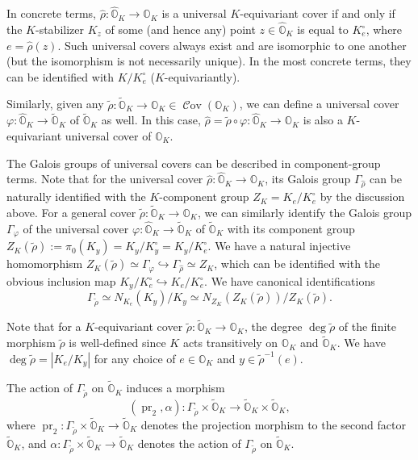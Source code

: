 \documentclass[11pt, a4paper]{amsart}
\newcommand{\orb}{\mathbb{O}}
\newcommand{\orbk}{\orb_{K}}
\newcommand{\torbk}{\widetilde{\orb}_{K}}
\newcommand{\horbk}{\widehat{\orb}_{K}}
\DeclareMathOperator{\Cov}{\mathcal{C}ov}
\newcommand{\pr}{\operatorname{pr}}
\theoremstyle{definition}
\numberwithin{equation}{section}
\begin{document}
In concrete terms, $\hat{\rho}: \horbk \to \orbk$ is a universal $K$-equivariant cover if and only if the $K$-stabilizer $K_z$ of some (and hence any) point $z \in \horbk$ is equal to $K_e^\circ$, where $e = \hat{\rho}(z)$. Such universal covers always exist and are isomorphic to one another (but the isomorphism is not necessarily unique). In the most concrete terms, they can be identified with $K/K_e^\circ$ ($K$-equivariantly).

Similarly, given any $\tilde{\rho}: \torbk \to \orbk \in \Cov(\orbk)$, we can define a universal cover $\varphi: \horbk \to \torbk$ of $\torbk$ as well. In this case, $\hat{\rho}=\tilde{\rho} \circ \varphi: \horbk \to \orbk$ is also a $K$-equivariant universal cover of $\orbk$.

The Galois groups of universal covers can be described in component-group terms. Note that for the universal cover $\hat{\rho}: \horbk \to \orbk$, its Galois group $\Gamma_{\hat{\rho}}$ can be naturally identified with the $K$-component group $Z_K = K_e/K_e^\circ$ by the discussion above. For a general cover $\tilde{\rho}: \torbk \to \orbk$, we can similarly identify the Galois group $\Gamma_{\varphi}$ of the universal cover $\varphi: \horbk \to \torbk$ of $\torbk$ with its component group $Z_K(\tilde{\rho}) := \pi_0(K_y) = K_y/K_y^\circ = K_y/K_e^\circ$. We have a natural injective homomorphism $Z_K(\tilde{\rho}) \simeq \Gamma_{\varphi} \hookrightarrow \Gamma_{\hat{\rho}}\simeq Z_K$, which can be identified with the obvious inclusion map $K_y/K_e^\circ \hookrightarrow K_e/K_e^\circ$. We have canonical identifications   
\begin{equation} \label{eq:Galois_normalizer}
    \Gamma_{\tilde{\rho}} \simeq N_{K_e}(K_y)/K_y \simeq N_{Z_K}(Z_K(\tilde{\rho})) / Z_K(\tilde{\rho}).
\end{equation}

Note that for a $K$-equivariant cover $\tilde{\rho}: \torbk \to \orbk$, the degree $\deg \tilde{\rho}$ of the finite morphism $\tilde{\rho}$ is well-defined since $K$ acts transitively on $\orbk$ and $\torbk$. We have $\deg \tilde{\rho} = |K_e/K_y|$ for any choice of $e \in \orbk$ and $y \in \tilde{\rho}^{-1}(e)$. 

The action of $\Gamma_{\tilde{\rho}}$ on $\torbk$ induces a morphism 
	\[ (\pr_2, \alpha): \Gamma_{\tilde{\rho}} \times \torbk \to \torbk \times \torbk, \]
where $\pr_2: \Gamma_{\tilde{\rho}} \times \torbk \to \torbk$ denotes the projection morphism to the second factor $\torbk$, and $\alpha: \Gamma_{\tilde{\rho}} \times \torbk \to \torbk$ denotes the action of $\Gamma_{\tilde{\rho}}$ on $\torbk$.
\end{document}
